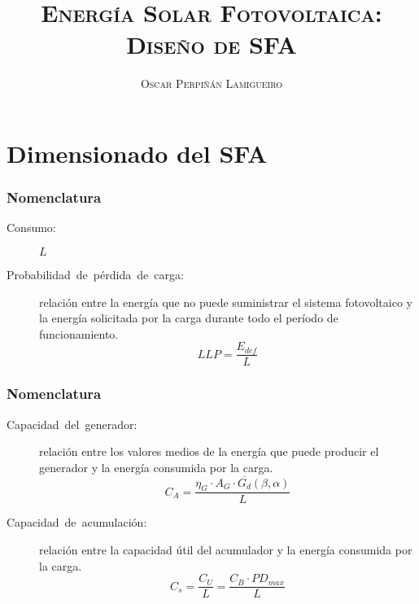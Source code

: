 \documentclass[serif, xcolor=dvipsnames]{beamer}
\begin{document}
\title[\textsc{ESF: Diseño SFA}]{\textsc{Energía Solar Fotovoltaica:}\\
\textsc{Diseño de SFA}}


\author{\textsc{Oscar Perpiñán Lamigueiro}}

\date{}

\frame[plain]{\titlepage}


%

\section{Dimensionado del SFA}


\begin{frame}
\frametitle{Nomenclatura}
\begin{description}
\item [{Consumo:}] $L$
\item [{Probabilidad~de~pérdida~de~carga:}] relación entre la energía
que no puede suministrar el sistema fotovoltaico y la energía solicitada
por la carga durante todo el período de funcionamiento.\[
LLP=\frac{E_{def}}{L}\]

\end{description}

\end{frame}

\begin{frame}
\frametitle{Nomenclatura}
\begin{description}
\item [{Capacidad~del~generador:}] relación entre los valores medios
de la energía que puede producir el generador y la energía consumida
por la carga. \[
C_{A}=\frac{\eta_{G}\cdot A_{G}\cdot\overline{G_{d}}(\beta,\alpha)}{L}\]

\item [{Capacidad~de~acumulación:}] relación entre la capacidad útil
del acumulador y la energía consumida por la carga.\[
C_{s}=\frac{C_{U}}{L}=\frac{C_{B}\cdot PD_{max}}{L}\]

\end{description}

\end{frame}
\end{document}
